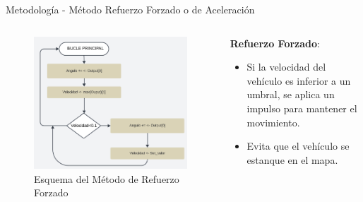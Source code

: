 \documentclass{beamer}
\begin{document}
\begin{frame}{Metodología - Método Refuerzo Forzado o de Aceleración}
    \begin{columns}[T] %
        \begin{column}{0.4\textwidth} %
            \begin{figure}
                \centering
                \includegraphics[width=1.1\linewidth]{images/reforce.png} %
                \caption{Esquema del Método de Refuerzo Forzado}
            \end{figure}
        \end{column}
        \begin{column}{0.6\textwidth}
            \textbf{Refuerzo Forzado}:
            \begin{itemize}
                \item Si la velocidad del vehículo es inferior a un umbral, se aplica un impulso para mantener el movimiento.
                \item Evita que el vehículo se estanque en el mapa.
            \end{itemize}
        \end{column}
    \end{columns}
\end{frame}
\end{document}
